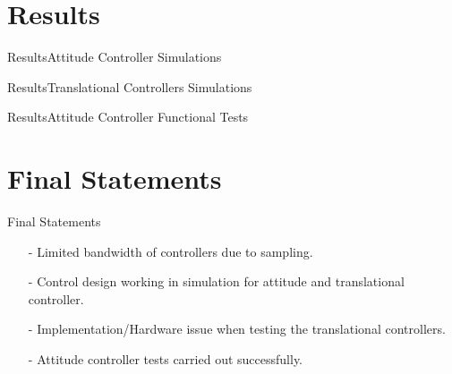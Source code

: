 \section{Results}
\begin{frame}{Results}{Attitude Controller Simulations}
    \begin{figure}[H]
    \end{figure}    
    \begin{figure}[H]
    \end{figure}    
\end{frame}

\begin{frame}{Results}{Translational Controllers Simulations}
    \begin{figure}[H]
    \end{figure}    
\end{frame}

\begin{frame}{Results}{Attitude Controller Functional Tests}
    \begin{figure}[H]
    \end{figure}    
    \begin{figure}[H]
    \end{figure}    
\end{frame}

\section{Final Statements}
\begin{frame}{Final Statements}{}
    \begin{itemize} 
        \item[-] Limited bandwidth of controllers due to sampling.
        \item[-] Control design working in simulation for attitude and translational controller. 
        \item[-] Implementation/Hardware issue when testing the translational controllers.
        \item[-] Attitude controller tests carried out successfully.
    \end{itemize}   
\end{frame}